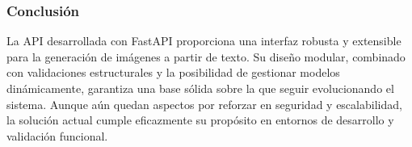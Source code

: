 \subsubsection{Conclusión}
La API desarrollada con FastAPI proporciona una interfaz robusta y extensible para la generación de imágenes a partir de texto. Su diseño modular, combinado con validaciones estructurales y la posibilidad de gestionar modelos dinámicamente, garantiza una base sólida sobre la que seguir evolucionando el sistema. Aunque aún quedan aspectos por reforzar en seguridad y escalabilidad, la solución actual cumple eficazmente su propósito en entornos de desarrollo y validación funcional.